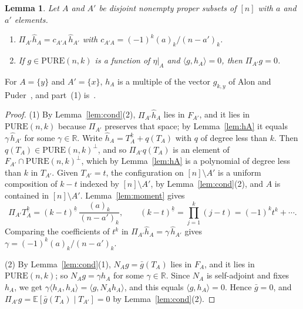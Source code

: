 \documentclass[11pt]{amsart}
\newtheorem{lem}[thm]{Lemma}
\theoremstyle{remark}
\numberwithin{equation}{section}
\newcommand{\R}{\mathbb R}
\newcommand{\PURE}{\mathrm{PURE}}
\newcommand{\ff}[2]{#1^{\underline{#2}}}
\begin{document}
\begin{lem}\label{lem:transfer}
Let $A$ and $A'$ be disjoint nonempty proper subsets of $[n]$ with $a$ and $a'$ elements.
\begin{enumerate}
\item $\Pi_{A'}\hat h_A=c_{A'A}\,\hat h_{A'}$ with $c_{A'A}=(-1)^k(a)_k/(n-a')_k$.
\item If $g\in\PURE(n,k)$ is a function of $\eta|_A$ and $\langle g,h_A\rangle=0$, then $\Pi_{A'}g=0$.
\end{enumerate}
\end{lem}

For $A=\{y\}$ and $A'=\{x\}$, $h_A$ is a multiple of the vector $g_{k,y}$ of Alon and Puder~\cite[Lemma~4.5]{AP26}, and part~(1) is~\cite[Lemma~4.6]{AP26}.

\begin{proof}
(1) By Lemma~\ref{lem:cond}(2), $\Pi_{A'}\hat h_A$ lies in $F_{A'}$, and it lies in $\PURE(n,k)$ because $\Pi_{A'}$ preserves that space; by Lemma~\ref{lem:hA} it equals $\gamma\,\hat h_{A'}$ for some $\gamma\in\R$. Write $\hat h_A=\ff{T_A}k+q(T_A)$ with $q$ of degree less than $k$. Then $q(T_A)\in\PURE(n,k)^\perp$, and so $\Pi_{A'}q(T_A)$ is an element of $F_{A'}\cap\PURE(n,k)^\perp$, which by Lemma~\ref{lem:hA} is a polynomial of degree less than $k$ in $T_{A'}$. Given $T_{A'}=t$, the configuration on $[n]\setminus A'$ is a uniform composition of $k-t$ indexed by $[n]\setminus A'$, by Lemma~\ref{lem:cond}(2), and $A$ is contained in $[n]\setminus A'$. Lemma~\ref{lem:moment} gives
\[
\Pi_{A'}\ff{T_A}k=\ff{(k-t)}k\,\frac{(a)_k}{(n-a')_k},\qquad \ff{(k-t)}k=\prod_{j=1}^k(j-t)=(-1)^kt^k+\cdots.
\]
Comparing the coefficients of $t^k$ in $\Pi_{A'}\hat h_A=\gamma\,\hat h_{A'}$ gives $\gamma=(-1)^k(a)_k/(n-a')_k$.

(2) By Lemma~\ref{lem:cond}(1), $N_Ag=\bar g(T_A)$ lies in $F_A$, and it lies in $\PURE(n,k)$; so $N_Ag=\gamma h_A$ for some $\gamma\in\R$. Since $N_A$ is self-adjoint and fixes $h_A$, we get $\gamma\langle h_A,h_A\rangle=\langle g,N_Ah_A\rangle$, and this equals $\langle g,h_A\rangle=0$. Hence $\bar g=0$, and $\Pi_{A'}g=\mathbb E[\bar g(T_A)\mid T_{A'}]=0$ by Lemma~\ref{lem:cond}(2).
\end{proof}
\end{document}
